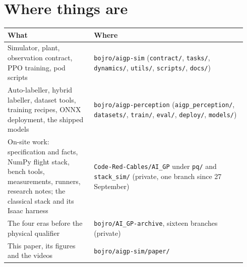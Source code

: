 \documentclass{article}
\begin{document}
\section{Where things are}
\begin{table}[htbp]\centering\small
\begin{tabular}{@{}p{0.34\linewidth}p{0.60\linewidth}@{}}
\toprule
What & Where \\ \midrule
Simulator, plant, observation contract, PPO training, pod scripts & \texttt{bojro/aigp-sim} (\texttt{contract/}, \texttt{tasks/}, \texttt{dynamics/}, \texttt{utils/}, \texttt{scripts/}, \texttt{docs/}) \\
Auto-labeller, hybrid labeller, dataset tools, training recipes, ONNX deployment, the shipped models & \texttt{bojro/aigp-perception} (\texttt{aigp\_perception/}, \texttt{datasets/}, \texttt{train/}, \texttt{eval/}, \texttt{deploy/}, \texttt{models/}) \\
On-site work: specification and facts, NumPy flight stack, bench tools, measurements, runners, research notes; the classical stack and its Isaac harness & \texttt{Code-Red-Cables/AI\_GP} under \texttt{pq/} and \texttt{stack\_sim/} (private, one branch since 27 September) \\
The four eras before the physical qualifier & \texttt{bojro/AI\_GP-archive}, sixteen branches (private) \\
This paper, its figures and the videos & \texttt{bojro/aigp-sim/paper/} \\
\bottomrule
\end{tabular}
\end{table}
\end{document}

